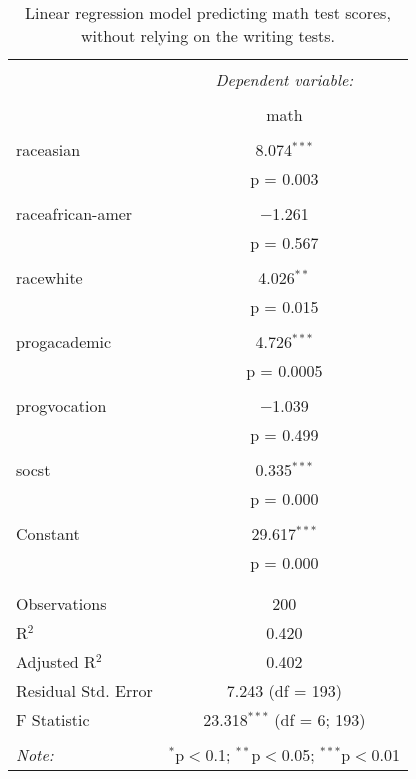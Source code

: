 
\begin{table}[!htbp] \centering 
  \caption{Linear regression model predicting math test scores, 
          without relying on the writing tests.} 
  \label{tab::lm_math_nopeeking} 
\begin{tabular}{@{\extracolsep{5pt}}lc} 
\\[-1.8ex]\hline 
\hline \\[-1.8ex] 
 & \multicolumn{1}{c}{\textit{Dependent variable:}} \\ 
\cline{2-2} 
\\[-1.8ex] & math \\ 
\hline \\[-1.8ex] 
 raceasian & 8.074$^{***}$ \\ 
  & p = 0.003 \\ 
  & \\ 
 raceafrican-amer & $-$1.261 \\ 
  & p = 0.567 \\ 
  & \\ 
 racewhite & 4.026$^{**}$ \\ 
  & p = 0.015 \\ 
  & \\ 
 progacademic & 4.726$^{***}$ \\ 
  & p = 0.0005 \\ 
  & \\ 
 progvocation & $-$1.039 \\ 
  & p = 0.499 \\ 
  & \\ 
 socst & 0.335$^{***}$ \\ 
  & p = 0.000 \\ 
  & \\ 
 Constant & 29.617$^{***}$ \\ 
  & p = 0.000 \\ 
  & \\ 
\hline \\[-1.8ex] 
Observations & 200 \\ 
R$^{2}$ & 0.420 \\ 
Adjusted R$^{2}$ & 0.402 \\ 
Residual Std. Error & 7.243 (df = 193) \\ 
F Statistic & 23.318$^{***}$ (df = 6; 193) \\ 
\hline 
\hline \\[-1.8ex] 
\textit{Note:}  & \multicolumn{1}{r}{$^{*}$p$<$0.1; $^{**}$p$<$0.05; $^{***}$p$<$0.01} \\ 
\end{tabular} 
\end{table} 
